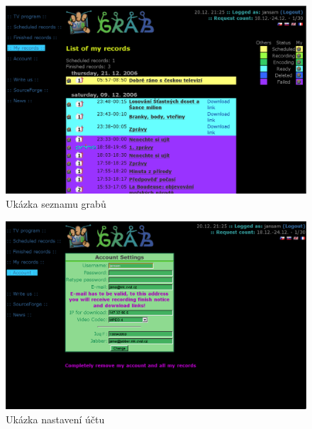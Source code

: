 \documentclass[11pt,twoside,a4paper]{dp_format}%
\begin{document}
\begin{figure}[ht]
\begin{center}
\includegraphics[width=12cm]{images/scrSeznam.eps}
\caption{Ukázka seznamu grabů}
\label{fig:scr3}
\end{center}
\end{figure}

\begin{figure}[ht]
\begin{center}
\includegraphics[width=12cm]{images/scrNastaveni.eps}
\caption{Ukázka nastavení účtu}
\label{fig:scr4}
\end{center}
\end{figure}

\vfil
\pagebreak

\cleardoublepage


\cleardoublepage


\cleardoublepage


\cleardoublepage
\end{document}
